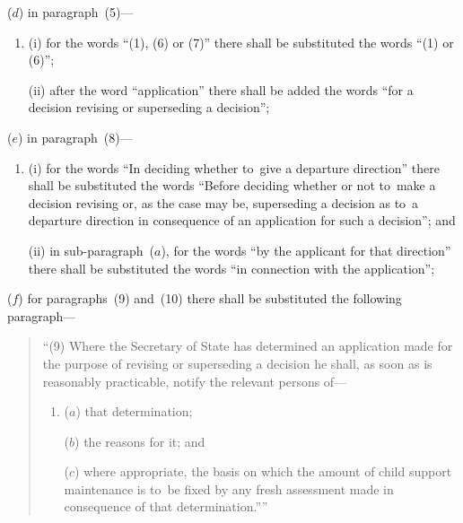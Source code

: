 \documentclass[12pt,a4paper]{article}
\begin{document}
\begin{enumerate}
($d$) in paragraph~(5)---
\begin{enumerate}\item[]
(i) for the words “(1), (6) or (7)” there shall be substituted the words “(1) or (6)”;

(ii) after the word “application” there shall be added the words “for a decision revising or superseding a decision”;
\end{enumerate}

($e$) in paragraph~(8)---
\begin{enumerate}\item[]
(i) for the words “In deciding whether to~give a departure direction” there shall be substituted the words “Before deciding whether or not to~make a decision revising or, as the case may be, superseding a decision as to~a departure direction in consequence of an application for such a decision”; and

(ii) in sub-paragraph~($a$), for the words “by the applicant for that direction” there shall be substituted the words “in connection with the application”;
\end{enumerate}

($f$) for paragraphs~(9) and~(10) there shall be substituted the following paragraph---
\begin{quotation}
“(9) Where the Secretary of State has determined an application made for the purpose of revising or superseding a decision he shall, as soon as is reasonably practicable, notify the relevant persons of---
\begin{enumerate}\item[]
($a$) that determination;

($b$) the reasons for it; and

($c$) where appropriate, the basis on which the amount of child support maintenance is to~be fixed by any fresh assessment made in consequence of that determination.””
\end{enumerate}
\end{quotation}
\end{enumerate}

\end{document}
